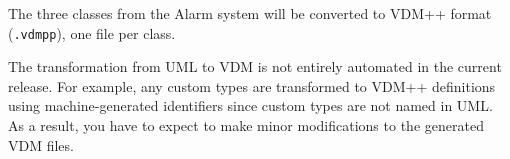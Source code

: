 The three classes from the Alarm system will be converted to VDM++ format
(\texttt{.vdmpp}), one file per class.



The transformation from UML to VDM is not entirely automated in the
current release. For
example, any custom types are transformed to VDM++ definitions using
machine-generated identifiers since custom types are not named in
UML. As a result, you have to expect to make minor modifications to
the generated VDM files. 

%


